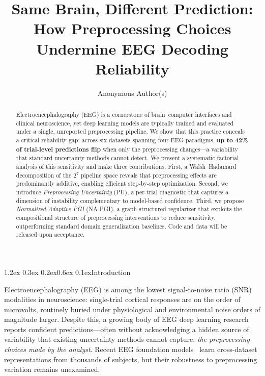 \documentclass{article}
\title{Same Brain, Different Prediction:\\How Preprocessing Choices Undermine EEG Decoding Reliability}
\author{
  Anonymous Author(s)
}
\makeatletter
\renewcommand{\section}{\@startsection{section}{1}{\z@}%
  {1.2ex \@plus 0.3ex \@minus 0.2ex}{0.6ex \@plus 0.1ex}{\large\bf}}
\makeatother
\begin{document}
\maketitle

\begin{abstract}
Electroencephalography (EEG) is a cornerstone of brain--computer interfaces and clinical neuroscience, yet deep learning models are typically trained and evaluated under a single, unreported preprocessing pipeline. We show that this practice conceals a critical reliability gap: across six datasets spanning four EEG paradigms, \textbf{up to 42\% of trial-level predictions flip} when only the preprocessing changes---a variability that standard uncertainty methods cannot detect.
We present a systematic factorial analysis of this sensitivity and make three contributions. First, a Walsh--Hadamard decomposition of the $2^7$ pipeline space reveals that preprocessing effects are predominantly additive, enabling efficient step-by-step optimization. Second, we introduce \emph{Preprocessing Uncertainty} (PU), a per-trial diagnostic that captures a dimension of instability complementary to model-based confidence. Third, we propose \emph{Normalized Adaptive PGI} (NA-PGI), a graph-structured regularizer that exploits the compositional structure of preprocessing interventions to reduce sensitivity, outperforming standard domain generalization baselines. Code and data will be released upon acceptance.
\end{abstract}

\section{Introduction}
\label{sec:intro}

Electroencephalography (EEG) is among the lowest signal-to-noise ratio (SNR) modalities in neuroscience: single-trial cortical responses are on the order of microvolts, routinely buried under physiological and environmental noise orders of magnitude larger. Despite this, a growing body of EEG deep learning research~\citep{roy2019deep,craik2019deep} reports confident predictions---often without acknowledging a hidden source of variability that existing uncertainty methods cannot capture: \emph{the preprocessing choices made by the analyst}. Recent EEG foundation models~\citep{kostas2021bendr,jiang2024large,yang2023biot,csbrain2025,neuript2025,reve2025} learn cross-dataset representations from thousands of subjects, but their robustness to preprocessing variation remains unexamined.
\end{document}
